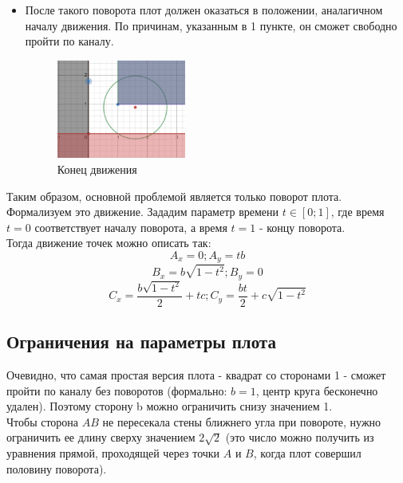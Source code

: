 \begin{itemize}
\newpage

\item После такого поворота плот должен оказаться в положении, аналагичном началу движения. По причинам, указанным в 1 пункте, он сможет свободно пройти по каналу.
\begin{figure}[!htb]
    \centering
    \includegraphics[width=0.4\textwidth]{fig/sofa3.png}
    \caption{Конец движения}
\end{figure}

\end{itemize}

Таким образом, основной проблемой является только поворот плота. Формализуем это движение. Зададим параметр времени $t \in [0;1]$, где время $t=0$ соответствует началу поворота, а время $t=1$ - концу поворота. \\

Тогда движение точек можно описать так:
\begin{equation}
A_x = 0; A_y=tb
\end{equation}
\begin{equation}
B_x = b\sqrt{1-t^2}; B_y=0
\end{equation}
\begin{equation}
C_x = \frac{b\sqrt{1-t^2}}{2}+tc; C_y=\frac{bt}{2}+c\sqrt{1-t^2}
\end{equation}


\subsection{Ограничения на параметры плота}
Очевидно, что самая простая версия плота - квадрат со сторонами 1 - сможет пройти по каналу без поворотов (формально: $b=1$, центр круга бесконечно удален). Поэтому сторону b можно ограничить снизу значением 1. \\

Чтобы сторона $AB$ не пересекала стены ближнего угла при повороте, нужно ограничить ее длину сверху значением $2\sqrt{2}$ (это число можно получить из уравнения прямой, проходящей через точки $A$ и $B$, когда плот совершил половину поворота). \\

